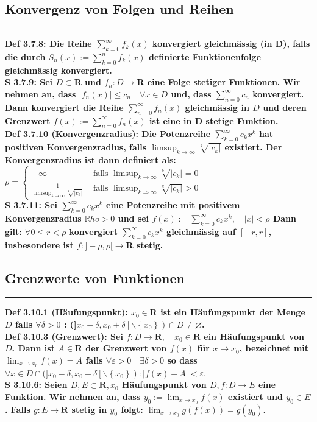 \documentclass[7pt,landscape, margin = 0.1mm]{article}
\newcommand*{\mysubsection}[1]{\vspace{-2mm}\color{chaptercolor}\subsection{ #1 }
\vspace{-1mm}\hrule\vspace{1.5mm}\color{black}
\vspace{2mm}}
\newcommand{\DEF}[2]{\color{chaptercolor}\bf{Def #1}:\color{black}    \hspace{0.2cm} #2 \\}
\newcommand{\SA}[2]{\color{chaptercolor}\bf{S #1}:\color{black}    \hspace{0.2cm} #2 \\}
\begin{document}
\begin{multicols}{4}
\begin{flushleft}
\mysubsection{Konvergenz von Folgen und Reihen}
\DEF{3.7.8}{Die Reihe $\sum_{k=0}^{\infty} f_k(x)$ konvergiert gleichmässig (in D), falls die durch
$ S_n(x):=\sum_{k=0}^n f_k(x) $
definierte Funktionenfolge gleichmässig konvergiert.}
\SA{3.7.9}{Sei $D \subset \mathbf{R}$ und $f_n: D \longrightarrow \mathbf{R}$ eine Folge stetiger Funktionen. Wir nehmen an, dass $\left|f_n(x)\right| \leqslant c_n \quad \forall x \in D$ und, dass $\sum_{n=0}^{\infty} c_{n}$ konvergiert. Dann konvergiert die Reihe
$  \sum_{n=0}^{\infty} f_n(x) $
gleichmässig in $D$ und deren Grenzwert
$ f(x):=\sum_{n=0}^{\infty} f_n(x) $
ist eine in D stetige Funktion.}
\DEF{3.7.10 (Konvergenzradius)}{Die Potenzreihe
$ \sum_{k=0}^{\infty} c_k x^k $
hat positiven Konvergenzradius, falls $\limsup_{k \rightarrow\infty} \sqrt[k]{\left|c_k\right|}$ existiert. Der Konvergenzradius ist dann definiert als:
$ \rho=\left\{\begin{array}{cc}+\infty & \text { falls } \limsup_{k \rightarrow\infty} \sqrt[k]{\left|c_k\right|}=0 \\\frac{1}{\limsup_{k \rightarrow\infty} \sqrt[k]{\left|c_k\right|}} & \text { falls } \limsup _{k \Rightarrow\infty} \sqrt[k]{\left|c_k\right|}>0\end{array}\right. $}

\SA{3.7.11}{Sei $\sum_{k=0}^{\infty} c_k x^k$ eine Potenzreihe mit positivem Konvergenzradius $\mathbb{R}ho>0$ und sei
$ f(x):=\sum_{k=0}^{\infty} c_k x^k, \quad|x|<\rho $
Dann gilt: $\forall 0 \leqslant r<\rho$ konvergiert
$ \sum_{k=0}^{\infty} c_k x^k $
gleichmässig auf $[-r, r]$, insbesondere ist $f:]-\rho, \rho[\longrightarrow \mathbf{R}$ stetig.}

\mysubsection{Grenzwerte von Funktionen}
\DEF{3.10.1 (Häufungspunkt)}{$x_0 \in \mathbf{R}$ ist ein Häufungspunkt der Menge $D$ falls $\forall \delta>0$ : (]$x_0-\delta, x_0+\delta\left[\backslash\left\{x_0\right\}\right) \cap D \neq \varnothing$.}
\DEF{3.10.3 (Grenzwert)}{Sei $f: D \longrightarrow \mathbf{R}, \quad x_0 \in \mathbf{R}$ ein Häufungspunkt von $D$. Dann ist $A \in \mathbf{R}$ der Grenzwert von $f(x)$ für $x \rightarrow x_0$, bezeichnet mit
$
\lim _{x \rightarrow x_0} f(x)=A
$
falls $\forall \varepsilon>0 \quad \exists \delta>0$ so dass
$
\forall x \in D \cap(] x_0-\delta, x_0+\delta\left[\backslash\left\{x_0\right\}\right):|f(x)-A|<\varepsilon .
$}
\SA{3.10.6}{Seien $D, E \subset \mathbf{R}, x_0$ Häufungspunkt von $D, f: D \longrightarrow E$ eine Funktion. Wir nehmen an, dass
$
y_0:=\lim _{x \rightarrow x_0} f(x)
$
existiert und $y_0 \in E$. Falls $g: E \longrightarrow \mathbf{R}$ stetig in $y_0$ folgt:
$
\lim _{x \rightarrow x_0} g(f(x))=g\left(y_0\right) .
$}


\end{flushleft}
\end{multicols}
\end{document}
